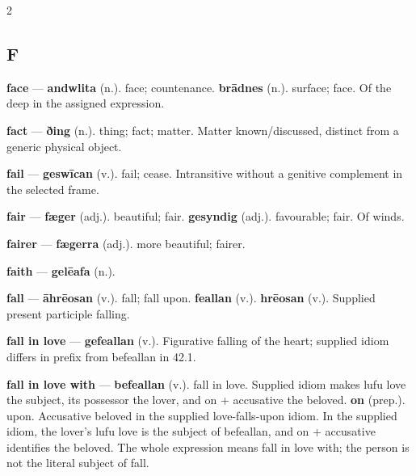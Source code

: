 \begin{multicols}{2}
\subsection*{F}
\textbf{face} — \textbf{andwlita} (n.). face; countenance. \textbf{brādnes} (n.). surface; face. Of the deep in the assigned expression.\par
\textbf{fact} — \textbf{ðing} (n.). thing; fact; matter. Matter known/discussed, distinct from a generic physical object.\par
\textbf{fail} — \textbf{geswīcan} (v.). fail; cease. Intransitive without a genitive complement in the selected frame.\par
\textbf{fair} — \textbf{fæger} (adj.). beautiful; fair. \textbf{gesyndig} (adj.). favourable; fair. Of winds.\par
\textbf{fairer} — \textbf{fægerra} (adj.). more beautiful; fairer.\par
\textbf{faith} — \textbf{gelēafa} (n.).\par
\textbf{fall} — \textbf{āhrēosan} (v.). fall; fall upon. \textbf{feallan} (v.).  \textbf{hrēosan} (v.). Supplied present participle falling.\par
\textbf{fall in love} — \textbf{gefeallan} (v.). Figurative falling of the heart; supplied idiom differs in prefix from befeallan in 42.1.\par
\textbf{fall in love with} — \textbf{befeallan} (v.). fall in love. Supplied idiom makes lufu love the subject, its possessor the lover, and on + accusative the beloved. \textbf{on} (prep.). upon. Accusative beloved in the supplied love-falls-upon idiom. In the supplied idiom, the lover’s lufu love is the subject of befeallan, and on + accusative identifies the beloved. The whole expression means fall in love with; the person is not the literal subject of fall.\par

\end{multicols}
